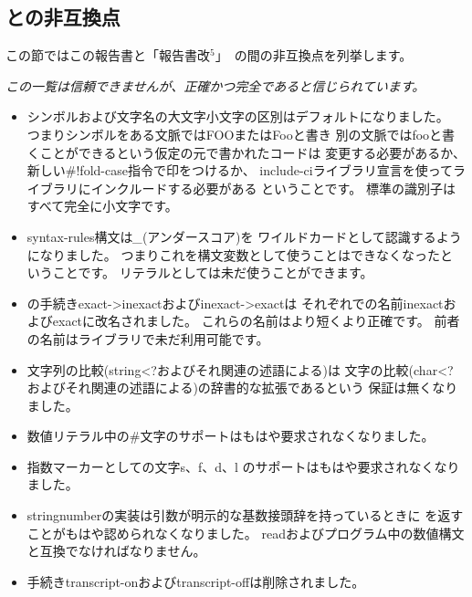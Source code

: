 

\subsection*{\rfivers{}との非互換点}
\label{incompatibilities}

この節ではこの報告書と「報告書改$^5$」~\cite{R5RS}の間の非互換点を列挙します。

{\em この一覧は信頼できませんが、正確かつ完全であると信じられています。}


\begin{itemize}

\item シンボルおよび文字名の大文字小文字の区別はデフォルトになりました。
つまりシンボルをある文脈では{\cf FOO}または{\cf Foo}と書き
別の文脈では{\cf foo}と書くことができるという仮定の元で書かれたコードは
変更する必要があるか、新しい{\cf \#!fold-case}指令で印をつけるか、
{\cf include-ci}ライブラリ宣言を使ってライブラリにインクルードする必要がある
ということです。
標準の識別子はすべて完全に小文字です。

\item {\cf syntax-rules}構文は{\em \_}(アンダースコア)を
ワイルドカードとして認識するようになりました。
つまりこれを構文変数として使うことはできなくなったということです。
リテラルとしては未だ使うことができます。

\item \rfivers{}の手続き{\cf exact->\+inexact}および{\cf inexact->\+exact}は
それぞれ\rsixrs{}での名前{\cf inexact}および{\cf exact}に改名されました。
これらの名前はより短くより正確です。
前者の名前は\rfivers{}ライブラリで未だ利用可能です。

\item 文字列の比較({\cf string<?}およびそれ関連の述語による)は
文字の比較({\cf char<?}およびそれ関連の述語による)の辞書的な拡張であるという
保証は無くなりました。

\item 数値リテラル中の\#文字のサポートはもはや要求されなくなりました。

\item 指数マーカーとしての文字{\cf s}、{\cf f}、{\cf d}、{\cf l}
のサポートはもはや要求されなくなりました。

\item {\cf string\coerce{}number}の実装は引数が明示的な基数接頭辞を持っているときに
\schfalse{}を返すことがもはや認められなくなりました。
{\cf read}およびプログラム中の数値構文と互換でなければなりません。

\item 手続き{\cf transcript-on}および{\cf transcript-off}は削除されました。

\end{itemize}

